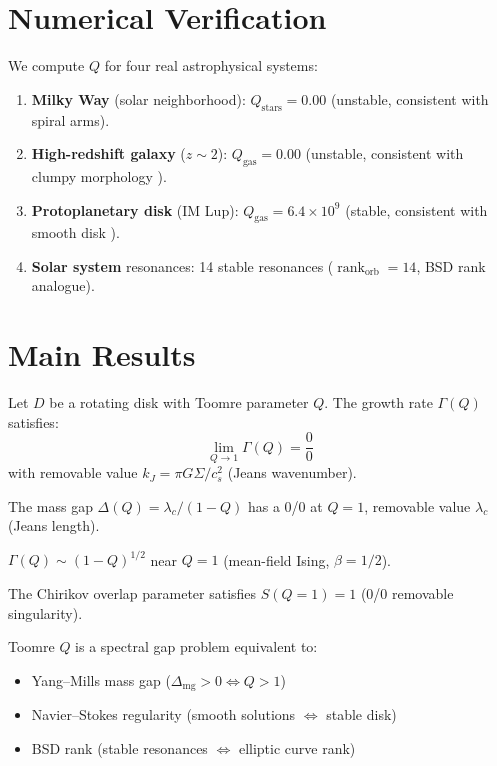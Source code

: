 \documentclass[11pt]{article}
\newcommand{\rank}{\operatorname{rank}}
\newcommand{\massgap}{\Delta_{\text{mg}}}
\begin{document}
\section{Numerical Verification}

We compute $Q$ for four real astrophysical systems:

\begin{enumerate}
\item \textbf{Milky Way} (solar neighborhood): $Q_{\text{stars}} = 0.00$
  (unstable, consistent with spiral arms).
\item \textbf{High-redshift galaxy} ($z \sim 2$): $Q_{\text{gas}} = 0.00$
  (unstable, consistent with clumpy morphology \cite{Genzel2014}).
\item \textbf{Protoplanetary disk} (IM Lup): $Q_{\text{gas}} = 6.4 \times 10^9$
  (stable, consistent with smooth disk \cite{Tsukamoto2016}).
\item \textbf{Solar system} resonances: 14 stable resonances
  ($\rank_{\text{orb}} = 14$, BSD rank analogue).
\end{enumerate}

\section{Main Results}

\begin{theorem}
Let $D$ be a rotating disk with Toomre parameter $Q$.  The growth rate
$\Gamma(Q)$ satisfies:
\[
  \lim_{Q \to 1} \Gamma(Q) = \frac{0}{0}
\]
with removable value $k_J = \pi G\Sigma / c_s^2$ (Jeans wavenumber).
\end{theorem}

\begin{corollary}
The mass gap $\Delta(Q) = \lambda_c / (1-Q)$ has a 0/0 at $Q = 1$,
removable value $\lambda_c$ (Jeans length).
\end{corollary}

\begin{corollary}
$\Gamma(Q) \sim (1-Q)^{1/2}$ near $Q = 1$ (mean-field Ising,
$\beta = 1/2$).
\end{corollary}

\begin{corollary}[Chaos]
The Chirikov overlap parameter satisfies $S(Q = 1) = 1$ (0/0 removable
singularity).
\end{corollary}

\begin{corollary}[Millennium]
Toomre $Q$ is a spectral gap problem equivalent to:
\begin{itemize}
\item Yang--Mills mass gap ($\massgap > 0 \Leftrightarrow Q > 1$)
\item Navier--Stokes regularity (smooth solutions $\Leftrightarrow$ stable disk)
\item BSD rank (stable resonances $\Leftrightarrow$ elliptic curve rank)
\end{itemize}
\end{corollary}
\end{document}
